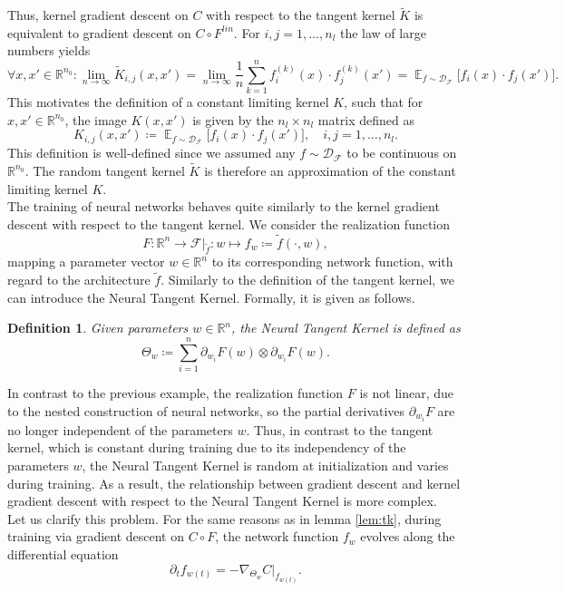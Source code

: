 \documentclass[11pt, a4paper]{article}
\newtheorem{definition}[theorem]{Definition}
\newcommand{\R}{\mathbb{R}}
\newcommand{\D}{\mathcal{D}}
\newcommand{\F}{\mathcal{F}}
\DeclareMathOperator*{\E}{\mathbb{E}}
\begin{document}
Thus, kernel gradient descent on $C$ with respect to the tangent kernel $\tilde{K}$ is equivalent to gradient descent on $C \circ F^\textit{lin}$. For $i,j = 1, \dots, n_l$ the law of large numbers yields
\[ \forall x,x' \in \R^{n_0} : \lim_{n \to \infty} \tilde{K}_{i,j}(x,x') = \lim_{n \to \infty} \frac{1}{n} \sum_{k=1}^{n} f_i^{(k)}(x) \cdot f_j^{(k)}(x') = \E_{f \sim \D_{\F}} \Big [ f_i(x) \cdot f_j(x') \Big ]. \]
This motivates the definition of a constant limiting kernel $K$, such that for $x,x' \in \R^{n_0}$, the image $K(x,x')$ is given by the $n_l \times n_l$ matrix defined as
\[ K_{i,j}(x,x') \coloneq \E_{f \sim \D_{\F}} \Big [ f_i(x) \cdot f_j(x') \Big ], \quad i,j=1,\dots,n_l. \]
This definition is well-defined since we assumed any $f \sim \D_\F$ to be continuous on $\R^{n_0}$. The random tangent kernel $\tilde{K}$ is therefore an approximation of the constant limiting kernel $K$. \\

The training of neural networks behaves quite similarly to the kernel gradient descent with respect to the tangent kernel. We consider the realization function
\[ F: \R^n \to \F|_{\tilde{f}} : w \mapsto f_w \coloneq \tilde{f}(\cdot,w), \]
mapping a parameter vector $w \in \R^n$ to its corresponding network function, with regard to the architecture $\tilde{f}$. Similarly to the definition of the tangent kernel, we can introduce the Neural Tangent Kernel. Formally, it is given as follows.
 
\begin{definition} \label{def:ntk}
Given parameters $w \in \R^n$, the Neural Tangent Kernel is defined as
\[ \Theta_w \coloneq \sum_{i=1}^{n} \partial_{w_i} F(w) \otimes \partial_{w_i} F(w). \]
\end{definition}

In contrast to the previous example, the realization function $F$ is not linear, due to the nested construction of neural networks, so the partial derivatives $\partial_{w_i}F$ are no longer independent of the parameters $w$. Thus, in contrast to the tangent kernel, which is constant during training due to its independency of the parameters $w$, the Neural Tangent Kernel is random at initialization and varies during training. As a result, the relationship between gradient descent and kernel gradient descent with respect to the Neural Tangent Kernel is more complex. \\

Let us clarify this problem. For the same reasons as in lemma \ref{lem:tk}, during training via gradient descent on $C \circ F$, the network function $f_w$ evolves along the differential equation
\[ \partial_tf_{w(t)} = -\nabla_{\Theta_w}C|_{f_{w(t)}}. \]
\end{document}
